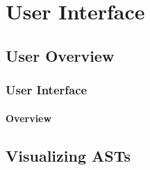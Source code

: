 \documentclass{beamer}
\begin{document}
\section{User Interface}

\subsection{User Overview}

\begin{frame}
    \frametitle{User Interface}
    \framesubtitle{Overview}
\end{frame}

\subsection{Visualizing ASTs}
\end{document}
